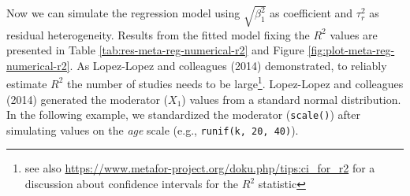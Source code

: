 \documentclass[
  man,floatsintext]{apa6}
\begin{document}
Now we can simulate the regression model using \(\sqrt{\beta^2_1}\) as coefficient and \(\tau_{r}^{2}\) as residual heterogeneity. Results from the fitted model fixing the \(R^{2}\) values are presented in Table \ref{tab:res-meta-reg-numerical-r2} and Figure \ref{fig:plot-meta-reg-numerical-r2}. As Lopez-Lopez and colleagues (2014) demonstrated, to reliably estimate \(R^{2}\) the number of studies needs to be large\footnote{see also \url{https://www.metafor-project.org/doku.php/tips:ci_for_r2} for a discussion about confidence intervals for the \(R^2\) statistic}. Lopez-Lopez and colleagues (2014) generated the moderator (\(X_{1}\)) values from a standard normal distribution. In the following example, we standardized the moderator (\texttt{scale()}) after simulating values on the \emph{age} scale
(e.g., \texttt{runif(k,\ 20,\ 40)}).

\scriptsize
\end{document}
